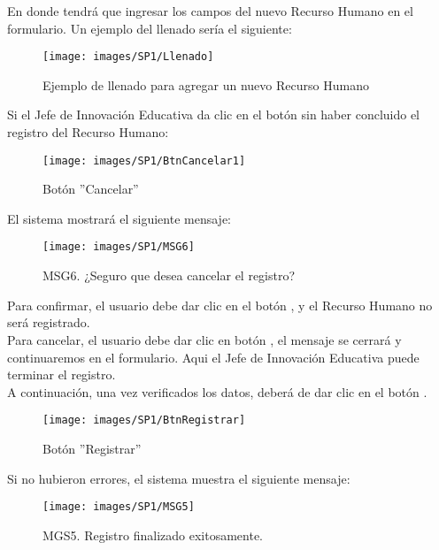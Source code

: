         En donde tendrá que ingresar los campos del nuevo Recurso Humano en el formulario. Un ejemplo del llenado sería el siguiente:
    
        \begin{figure}[!hbtp]
        	\centering
        	\hypertarget{ejreg}{\texttt{[image: images/SP1/Llenado]}}
        	\caption{Ejemplo de llenado para agregar un nuevo Recurso Humano}
        	\label{ejreg}
        \end{figure}
        \newpage
        Si el Jefe de Innovación Educativa da clic en el botón  sin haber concluido el registro del Recurso Humano:

        \begin{figure}[!hbtp]
        	\centering
        	\hypertarget{cancel1}{\texttt{[image: images/SP1/BtnCancelar1]}}
        	\caption{Botón ''Cancelar''}
        	\label{cancel1}
        \end{figure}

        El sistema mostrará el siguiente mensaje:
        \begin{figure}[!hbtp]
                \centering
                \hypertarget{buscar}{\texttt{[image: images/SP1/MSG6]}}
                \caption{MSG6. ¿Seguro que desea cancelar el registro?}
                \label{buscar}
        \end{figure}
        
        Para confirmar, el usuario debe dar clic en el botón , y el Recurso Humano no será registrado.\\
        
        Para cancelar, el usuario debe dar clic en botón , el mensaje se cerrará y continuaremos en el formulario. Aqui el Jefe de Innovación Educativa puede terminar el registro.\\
        
        A continuación, una vez verificados los datos, deberá de dar clic en el botón .
        \begin{figure}[!hbtp]
        	\centering
        	\hypertarget{btnreg}{\texttt{[image: images/SP1/BtnRegistrar]}}
        	\caption{Botón ''Registrar''}
        	\label{btnreg}
        \end{figure}

        Si no hubieron errores, el sistema muestra el siguiente mensaje:
        \newpage
        \begin{figure}[!hbtp]
                \centering
                \hypertarget{buscar}{\texttt{[image: images/SP1/MSG5]}}
                \caption{MGS5. Registro finalizado exitosamente.}
                \label{buscar}
        \end{figure}

